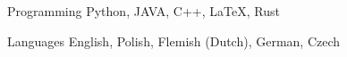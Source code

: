 

\begin{cvskills}


  \cvskill
    {Programming} %
    {Python, JAVA, C++, LaTeX, Rust} %

  \cvskill
    {Languages} %
    {English, Polish, Flemish (Dutch), German, Czech} %

\end{cvskills}
